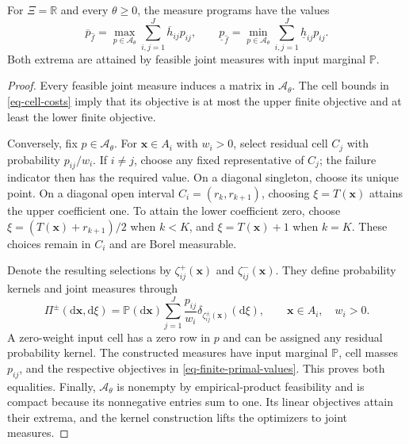 \begin{lemma}
  \label{lem-exact-aggregation}
  For $\Xi=\mathbb R$ and every $\theta\ge0$, the measure programs have the values
  \begin{equation}
    \overline p_{\hat f}=\max_{p\in\mathcal A_\theta}\sum_{i,j=1}^J\overline h_{ij}p_{ij},\qquad
    \underline p_{\hat f}=\min_{p\in\mathcal A_\theta}\sum_{i,j=1}^J\underline h_{ij}p_{ij}.
    \label{eq-finite-primal-values}
  \end{equation}
  Both extrema are attained by feasible joint measures with input marginal $\mathbb P$.
\end{lemma}
\begin{proof}
  Every feasible joint measure induces a matrix in $\mathcal A_\theta$. The cell bounds in \eqref{eq-cell-costs} imply that its objective is at most the upper finite objective and at least the lower finite objective.

  Conversely, fix $p\in\mathcal A_\theta$. For $\bm x\in A_i$ with $w_i>0$, select residual cell $C_j$ with probability $p_{ij}/w_i$. If $i\ne j$, choose any fixed representative of $C_j$; the failure indicator then has the required value. On a diagonal singleton, choose its unique point. On a diagonal open interval $C_i=(r_k,r_{k+1})$, choosing $\xi=T(\bm x)$ attains the upper coefficient one. To attain the lower coefficient zero, choose $\xi=(T(\bm x)+r_{k+1})/2$ when $k<K$, and $\xi=T(\bm x)+1$ when $k=K$. These choices remain in $C_i$ and are Borel measurable.

  Denote the resulting selections by $\zeta_{ij}^{+}(\bm x)$ and $\zeta_{ij}^{-}(\bm x)$. They define probability kernels and joint measures through
  \[
    \Pi^{\pm}\left(\mathrm d\bm x,\mathrm d\xi\right)
    =\mathbb P\left(\mathrm d\bm x\right)
    \sum_{j=1}^J\frac{p_{ij}}{w_i}
    \delta_{\zeta_{ij}^{\pm}(\bm x)}\left(\mathrm d\xi\right),
    \qquad\bm x\in A_i,\quad w_i>0.
  \]
  A zero-weight input cell has a zero row in $p$ and can be assigned any residual probability kernel. The constructed measures have input marginal $\mathbb P$, cell masses $p_{ij}$, and the respective objectives in \eqref{eq-finite-primal-values}. This proves both equalities. Finally, $\mathcal A_\theta$ is nonempty by empirical-product feasibility and is compact because its nonnegative entries sum to one. Its linear objectives attain their extrema, and the kernel construction lifts the optimizers to joint measures.
\end{proof}

